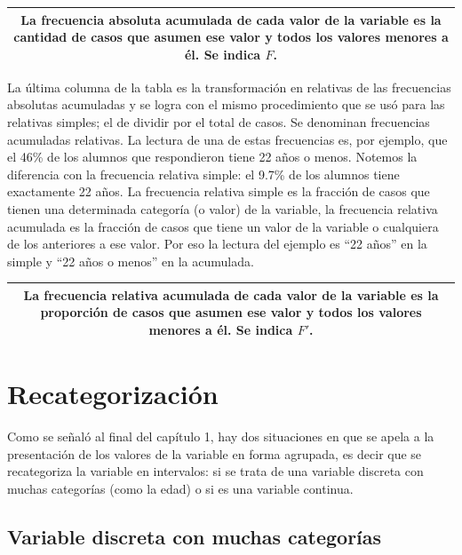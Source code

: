 \documentclass[]{book}
\begin{document}
\begin{longtable}[]{@{}c@{}}
\toprule
\endhead
\begin{minipage}[t]{0.97\columnwidth}\centering
La \textbf{frecuencia absoluta acumulada} de cada valor de la variable es la cantidad de casos que asumen ese valor y todos los valores menores a él. Se indica \(F\).\strut
\end{minipage}\tabularnewline
\bottomrule
\end{longtable}

La última columna de la tabla es la transformación en relativas de las frecuencias absolutas acumuladas y se logra con el mismo procedimiento que se usó para las relativas simples; el de dividir por el total de casos. Se denominan frecuencias acumuladas relativas. La lectura de una de estas frecuencias es, por ejemplo, que el 46\% de los alumnos que respondieron tiene 22 años o menos. Notemos la diferencia con la frecuencia relativa simple: el 9.7\% de los alumnos tiene exactamente 22 años. La frecuencia relativa simple es la fracción de casos que tienen una determinada categoría (o valor) de la variable, la frecuencia relativa acumulada es la fracción de casos que tiene un valor de la variable o cualquiera de los anteriores a ese valor. Por eso la lectura del ejemplo es ``22 años'' en la simple y ``22 años o menos'' en la acumulada.

\begin{longtable}[]{@{}c@{}}
\toprule
\endhead
\begin{minipage}[t]{0.97\columnwidth}\centering
La \textbf{frecuencia relativa acumulada} de cada valor de la variable es la proporción de casos que asumen ese valor y todos los valores menores a él. Se indica \(F'\).\strut
\end{minipage}\tabularnewline
\bottomrule
\end{longtable}

\hypertarget{recategorizaciuxf3n}{%
\section{Recategorización}\label{recategorizaciuxf3n}}

Como se señaló al final del capítulo 1, hay dos situaciones en que se apela a la presentación de los valores de la variable en forma agrupada, es decir que se recategoriza la variable en intervalos: si se trata de una variable discreta con muchas categorías (como la edad) o si es una variable continua.

\hypertarget{variable-discreta-con-muchas-categoruxedas}{%
\subsection{Variable discreta con muchas categorías}\label{variable-discreta-con-muchas-categoruxedas}}
\end{document}
